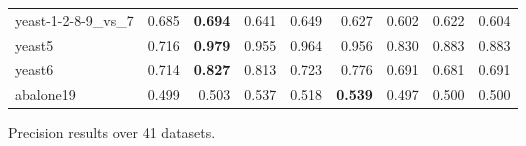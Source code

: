 \begin{table}[!htbp]
{\begin{tabular}{lrrrrrrrr}
			yeast-1-2-8-9\_vs\_7 & 0.685 & \textbf{0.694} & 0.641 & 0.649 & 0.627 & 0.602 & 0.622 & 0.604 \\
			yeast5 & 0.716 & \textbf{0.979} & 0.955 & 0.964 & 0.956 & 0.830 & 0.883 & 0.883 \\
			yeast6 & 0.714 & \textbf{0.827} & 0.813 & 0.723 & 0.776 & 0.691 & 0.681 & 0.691 \\
			abalone19 & 0.499 & 0.503 & 0.537 & 0.518 & \textbf{0.539} & 0.497 & 0.500 & 0.500 \\
			\bottomrule
		\end{tabular}%
		
	}
	\label{tab:Recall}%
\end{table}%



\begin{table}[!hhbp]
	\centering
	\caption{Precision results over 41 datasets.}
	\resizebox{0.97\columnwidth}{!}{%
		
}
\end{table}
